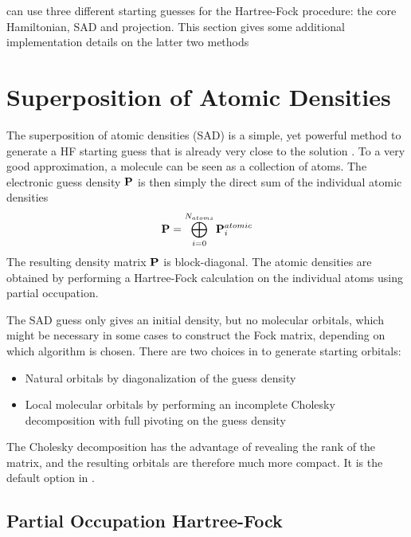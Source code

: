 \mchem{} can use three different starting guesses for the Hartree-Fock procedure: the core Hamiltonian, SAD and projection. This section gives some additional implementation details on the latter two methods

\section{Superposition of Atomic Densities}

The superposition of atomic densities (SAD) is a simple, yet powerful method to generate a HF starting guess that is already very close to the solution \cite{Van2006,Leh2019}. To a very good approximation, a molecule can be seen as a collection of atoms. The electronic guess density $\mathbf{P}$ is then simply the direct sum of the individual atomic densities 
\begin{equation}
\mathbf{P} = \bigoplus_{i=0}^{N_{atoms}} \mathbf{P}^{atomic}_i 
\end{equation}
\noindent The resulting density matrix $\mathbf{P}$ is block-diagonal. The atomic densities are obtained by performing a Hartree-Fock calculation on the individual atoms using partial occupation.

The SAD guess only gives an initial density, but no molecular orbitals, which might be necessary in some cases to construct the Fock matrix, depending on which algorithm is chosen. There are two choices in \mchem{} to generate starting orbitals:
\begin{itemize}
\item Natural orbitals by diagonalization of the guess density
\item Local molecular orbitals by performing an incomplete Cholesky decomposition with full pivoting on the guess density
\end{itemize}
The Cholesky decomposition has the advantage of revealing the rank of the matrix, and the resulting orbitals are therefore much more compact. It is the default option in \mchem{}.

\subsection{Partial Occupation Hartree-Fock}

